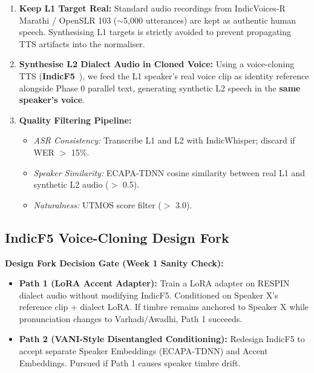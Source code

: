 \documentclass[11pt]{article}
\begin{document}
\begin{enumerate}[leftmargin=*]
  \item \textbf{Keep L1 Target Real:} Standard audio recordings from IndicVoices-R Marathi / OpenSLR 103 ($\sim$5,000 utterances) are kept as authentic human speech. Synthesising L1 targets is strictly avoided to prevent propagating TTS artifacts into the normaliser.
  \item \textbf{Synthesise L2 Dialect Audio in Cloned Voice:} Using a voice-cloning TTS (\textbf{IndicF5}~\cite{indicf5}), we feed the L1 speaker's real voice clip as identity reference alongside Phase 0 parallel text, generating synthetic L2 speech in the \textbf{same speaker's voice}.
  \item \textbf{Quality Filtering Pipeline:}
    \begin{itemize}[leftmargin=*]
      \item \textit{ASR Consistency:} Transcribe L1 and L2 with IndicWhisper; discard if WER $>$ 15\%.
      \item \textit{Speaker Similarity:} ECAPA-TDNN cosine similarity between real L1 and synthetic L2 audio ($>$ 0.5).
      \item \textit{Naturalness:} UTMOS score filter ($>$ 3.0).
    \end{itemize}
\end{enumerate}

\subsection{IndicF5 Voice-Cloning Design Fork}
\begin{infobox}
\textbf{Design Fork Decision Gate (Week 1 Sanity Check):}
\begin{itemize}[leftmargin=*]
  \item \textbf{Path 1 (LoRA Accent Adapter):} Train a LoRA adapter on RESPIN dialect audio without modifying IndicF5. Conditioned on Speaker X's reference clip + dialect LoRA. If timbre remains anchored to Speaker X while pronunciation changes to Varhadi/Awadhi, Path 1 succeeds.
  \item \textbf{Path 2 (VANI-Style Disentangled Conditioning):} Redesign IndicF5 to accept separate Speaker Embeddings (ECAPA-TDNN) and Accent Embeddings. Pursued if Path 1 causes speaker timbre drift.
\end{itemize}
\end{infobox}
\end{document}

